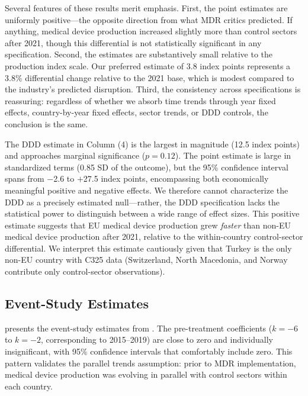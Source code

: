 \documentclass[12pt]{article}
\begin{document}


Several features of these results merit emphasis. First, the point estimates are uniformly positive---the opposite direction from what MDR critics predicted. If anything, medical device production increased slightly more than control sectors after 2021, though this differential is not statistically significant in any specification. Second, the estimates are substantively small relative to the production index scale. Our preferred estimate of 3.8 index points represents a 3.8\% differential change relative to the 2021 base, which is modest compared to the industry's predicted disruption. Third, the consistency across specifications is reassuring: regardless of whether we absorb time trends through year fixed effects, country-by-year fixed effects, sector trends, or DDD controls, the conclusion is the same.

The DDD estimate in Column (4) is the largest in magnitude (12.5 index points) and approaches marginal significance ($p = 0.12$). The point estimate is large in standardized terms (0.85 SD of the outcome), but the 95\% confidence interval spans from $-$2.6 to $+$27.5 index points, encompassing both economically meaningful positive and negative effects. We therefore cannot characterize the DDD as a precisely estimated null---rather, the DDD specification lacks the statistical power to distinguish between a wide range of effect sizes. This positive estimate suggests that EU medical device production grew \textit{faster} than non-EU medical device production after 2021, relative to the within-country control-sector differential. We interpret this estimate cautiously given that Turkey is the only non-EU country with C325 data (Switzerland, North Macedonia, and Norway contribute only control-sector observations).

\subsection{Event-Study Estimates}

 presents the event-study estimates from . The pre-treatment coefficients ($k = -6$ to $k = -2$, corresponding to 2015--2019) are close to zero and individually insignificant, with 95\% confidence intervals that comfortably include zero. This pattern validates the parallel trends assumption: prior to MDR implementation, medical device production was evolving in parallel with control sectors within each country.
\end{document}
